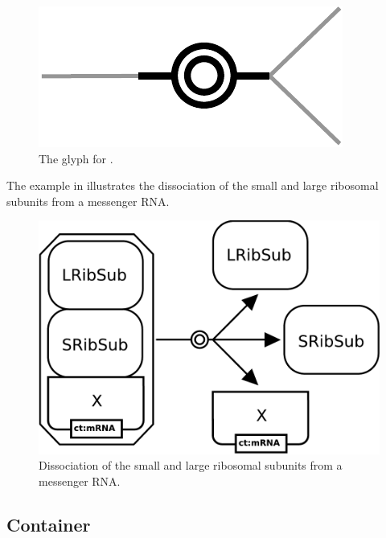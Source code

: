 \begin{figure}[H]
  \centering
  \includegraphics[scale = 0.5]{images/dissociation}
  \caption{The \PD glyph for .}
  \label{fig:dissociation}
\end{figure}

The example in  illustrates the dissociation of the small and large ribosomal subunits from a messenger RNA.

\begin{figure}[H]
  \centering
  \includegraphics[scale = 0.3]{examples/dissociation-ribosome}
  \caption{Dissociation of the small and large ribosomal subunits from a messenger RNA.}
  \label{fig:dissoc-ribo}
\end{figure}



\subsection{Container}

